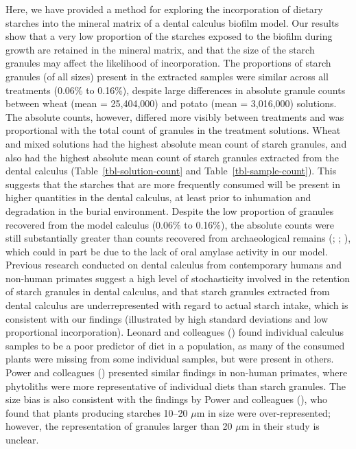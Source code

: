 \documentclass[
  b5paper,
]{book}
\begin{document}
Here, we have provided a method for exploring the incorporation of
dietary starches into the mineral matrix of a dental calculus biofilm
model. Our results show that a very low proportion of the starches
exposed to the biofilm during growth are retained in the mineral matrix,
and that the size of the starch granules may affect the likelihood of
incorporation. The proportions of starch granules (of all sizes) present
in the extracted samples were similar across all treatments (0.06\% to
0.16\%), despite large differences in absolute granule counts between
wheat (mean = 25,404,000) and potato (mean = 3,016,000) solutions.\\
The absolute counts, however, differed more visibly between treatments
and was proportional with the total count of granules in the treatment
solutions. Wheat and mixed solutions had the highest absolute mean count
of starch granules, and also had the highest absolute mean count of
starch granules extracted from the dental calculus
(Table~\ref{tbl-solution-count} and Table~\ref{tbl-sample-count}). This
suggests that the starches that are more frequently consumed will be
present in higher quantities in the dental calculus, at least prior to
inhumation and degradation in the burial environment. Despite the low
proportion of granules recovered from the model calculus (0.06\% to
0.16\%), the absolute counts were still substantially greater than
counts recovered from archaeological remains
(;
;
), which could in part be due to the lack of oral amylase activity
in our model. Previous research conducted on dental calculus from
contemporary humans and non-human primates suggest a high level of
stochasticity involved in the retention of starch granules in dental
calculus, and that starch granules extracted from dental calculus are
underrepresented with regard to actual starch intake, which is
consistent with our findings (illustrated by high standard deviations
and low proportional incorporation). Leonard and colleagues
() found individual
calculus samples to be a poor predictor of diet in a population, as many
of the consumed plants were missing from some individual samples, but
were present in others.\\
Power and colleagues ()
presented similar findings in non-human primates, where phytoliths were
more representative of individual diets than starch granules. The size
bias is also consistent with the findings by Power and colleagues
(), who found that plants
producing starches 10--20 \(\mu\)m in size were over-represented;
however, the representation of granules larger than 20 \(\mu\)m in their
study is unclear.
\end{document}
